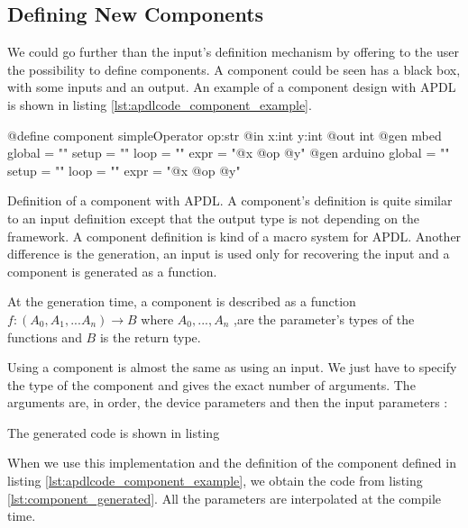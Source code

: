 \subsection{Defining New Components}
\label{sec:defining_component}

We could go further than the input’s definition mechanism by offering to the
user the possibility to define components. A component could be seen has a
black box, with some inputs and an output. An example of a component design with
\gls{APDL} is shown in listing \ref{lst:apdlcode_component_example}.

\begin{listing}[H]
  \centering
\begin{apdlcode}
@define component simpleOperator op:str {
    @in x:int y:int
    @out int
    @gen mbed {
        global = ""
        setup = ""
        loop = ""
        expr = "@x @op @y"
    }
    @gen arduino {
        global = ""
        setup = ""
        loop = ""
        expr = "@x @op @y"
    }
}
\end{apdlcode}
  \caption[Definition of a component with \gls{APDL}]{Definition of a component
with \gls{APDL}. A component’s definition is quite similar to an input
definition except that the output type is not depending on the framework. A
component definition is kind of a macro system for \gls{APDL}. Another
difference is the generation, an input is used only for recovering the input and
a component is generated as a function.}
  \label{lst:apdlcode_component_example}
\end{listing}

At the generation time, a component is described as a function $f :
(A_0,A_1,...A_n) \rightarrow B$ where $A_0,...,A_n$ ,are the parameter’s types of
the functions and $B$ is the return type.

Using a component is almost the same as using an input. We just have to
specify the type of the component and gives the exact number of arguments.
The arguments are, in order, the device parameters and then the input parameters :


The generated code is shown in listing 

When we use this implementation and the definition of the component defined in
listing \ref{lst:apdlcode_component_example}, we obtain the code from listing
\ref{lst:component_generated}. All the parameters are interpolated at the
compile time.

